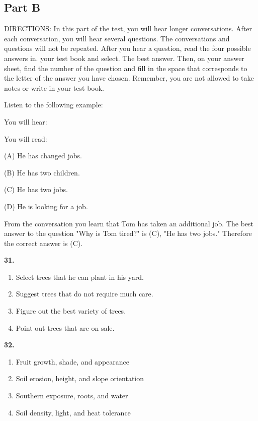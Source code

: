 \documentclass[12pt]{article}
\begin{document}
\subsection*{Part B}
DIRECTIONS: In this part of the test, you will hear longer conversations. After each conversation, you will hear several questions. The conversations and questions will not be repeated. After you hear a question, read the four possible answers in. your test book and select. The best answer. Then, on your answer sheet, find the number of the question and fill in the space that corresponds to the letter of the answer you have chosen. Remember, you are not allowed to take notes or write in your test book.\par
\begin{exampleblock}
Listen to the following example:\par
You will hear:\par
You will read:\par
(A) He has changed jobs.\par
(B) He has two children.\par
(C) He has two jobs.\par
(D) He is looking for a job.\par
From the conversation you learn that Tom has taken an additional job. The best answer to the question "Why is Tom tired?" is (C), "He has two jobs." Therefore the correct answer is (C).\par
\end{exampleblock}
\noindent\textbf{31.}
\begin{enumerate}[label=(\Alph*),leftmargin=*,itemsep=0.2em]
\item Select trees that he can plant in his yard.
\item Suggest trees that do not require much care.
\item Figure out the best variety of trees.
\item Point out trees that are on sale.
\end{enumerate}
\par
\vspace{0.25\baselineskip}
\noindent\textbf{32.}
\begin{enumerate}[label=(\Alph*),leftmargin=*,itemsep=0.2em]
\item Fruit growth, shade, and appearance
\item Soil erosion, height, and slope orientation
\item Southern exposure, roots, and water
\item Soil density, light, and heat tolerance
\end{enumerate}
\end{document}
